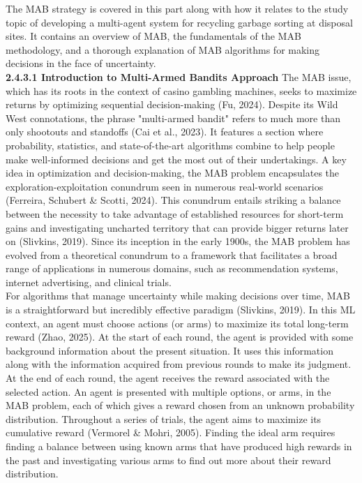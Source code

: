 \documentclass[a4paper,11pt,onecolumn]{article}
\begin{document}
The MAB strategy is covered in this part along with how it relates to the study topic of developing a multi-agent system for recycling garbage sorting at disposal sites. It contains an overview of MAB, the fundamentals of the MAB methodology, and a thorough explanation of MAB algorithms for making decisions in the face of uncertainty. \\
\textbf{2.4.3.1 Introduction to Multi-Armed Bandits Approach}
The MAB issue, which has its roots in the context of casino gambling machines, seeks to maximize returns by optimizing sequential decision-making (Fu, 2024). Despite its Wild West connotations, the phrase "multi-armed bandit" refers to much more than only shootouts and standoffs (Cai et al., 2023). It features a section where probability, statistics, and state-of-the-art algorithms combine to help people make well-informed decisions and get the most out of their undertakings.  A key idea in optimization and decision-making, the MAB problem encapsulates the exploration-exploitation conundrum seen in numerous real-world scenarios (Ferreira, Schubert & Scotti, 2024). This conundrum entails striking a balance between the necessity to take advantage of established resources for short-term gains and investigating uncharted territory that can provide bigger returns later on (Slivkins, 2019). Since its inception in the early 1900s, the MAB problem has evolved from a theoretical conundrum to a framework that facilitates a broad range of applications in numerous domains, such as recommendation systems, internet advertising, and clinical trials. \\
For algorithms that manage uncertainty while making decisions over time, MAB is a straightforward but incredibly effective paradigm (Slivkins, 2019). In this ML context, an agent must choose actions (or arms) to maximize its total long-term reward (Zhao, 2025). At the start of each round, the agent is provided with some background information about the present situation. It uses this information along with the information acquired from previous rounds to make its judgment. At the end of each round, the agent receives the reward associated with the selected action. An agent is presented with multiple options, or arms, in the MAB problem, each of which gives a reward chosen from an unknown probability distribution. Throughout a series of trials, the agent aims to maximize its cumulative reward (Vermorel & Mohri, 2005). Finding the ideal arm requires finding a balance between using known arms that have produced high rewards in the past and investigating various arms to find out more about their reward distribution.\\
\end{document}
